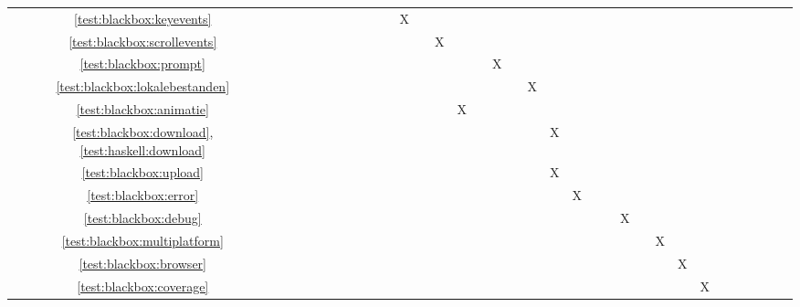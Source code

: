 \begin{tabular}{cc|c|c|c|c|c|c|c|c|c|c|c|c|c|c|c|c|c|c|c|c|c|c|c|c|c|c|c|c|c|c|c|c|c|}
\multicolumn{1}{|c|}{} & \ref{test:blackbox:keyevents}	 								&   &   &   &   &   &   &   &   &   &   & X &   &   &   &   &   &   &   &   &   &   &   &   &   &   &   &		 \\ \cline{2-29}
\multicolumn{1}{|c|}{} & \ref{test:blackbox:scrollevents}								&   &   &   &   &   &   &   &   &   &   &   &   & X &   &   &   &   &   &   &   &   &   &   &   &   &   &		 \\ \cline{2-29}


\multicolumn{1}{|c|}{} & \ref{test:blackbox:prompt}										&   &   &   &   &   &   &   &   &   &   &   &   &   &   &   & X &   &   &   &   &   &   &   &   &   &   &		 \\ \cline{2-29}
\multicolumn{1}{|c|}{} & \ref{test:blackbox:lokalebestanden}							&   &   &   &   &   &   &   &   &   &   &   &   &   &   &   &   &   & X &   &   &   &   &   &   &   &   &		 \\ \cline{2-29}
\multicolumn{1}{|c|}{} & \ref{test:blackbox:animatie}									&   &   &   &   &   &   &   &   &   &   &   &   &   & X &   &   &   &   &   &   &   &   &   &   &   &   &		 \\ \cline{2-29}
\multicolumn{1}{|c|}{} & \ref{test:blackbox:download}, \ref{test:haskell:download}		&   &   &   &   &   &   &   &   &   &   &   &   &   &   &   &   &   &   & X &   &   &   &   &   &   &   &		 \\ \cline{2-29}
\multicolumn{1}{|c|}{} & \ref{test:blackbox:upload} 									&   &   &   &   &   &   &   &   &   &   &   &   &   &   &   &   &   &   & X &   &   &   &   &   &   &   &		 \\ \cline{2-29}
\multicolumn{1}{|c|}{} & \ref{test:blackbox:error} 										&   &   &   &   &   &   &   &   &   &   &   &   &   &   &   &   &   &   &   & X &   &   &   &   &   &   &		 \\ \cline{2-29}
\multicolumn{1}{|c|}{} & \ref{test:blackbox:debug} 										&   &   &   &   &   &   &   &   &   &   &   &   &   &   &   &   &   &   &   &   &   &   & X &   &   &   &		 \\ \cline{2-29}
\multicolumn{1}{|c|}{} & \ref{test:blackbox:multiplatform} 								&   &   &   &   &   &   &   &   &   &   &   &   &   &   &   &   &   &   &   &   &   &   &   &   & X &   &		 \\ \cline{2-29}
\multicolumn{1}{|c|}{} & \ref{test:blackbox:browser} 									&   &   &   &   &   &   &   &   &   &   &   &   &   &   &   &   &   &   &   &   &   &   &   &   &   & X &		 \\ \cline{2-29}
\multicolumn{1}{|c|}{} & \ref{test:blackbox:coverage} 									&   &   &   &   &   &   &   &   &   &   &   &   &   &   &   &   &   &   &   &   &   &   &   &   &   &   & X	 	 \\ \cline{2-29}
\end{tabular}